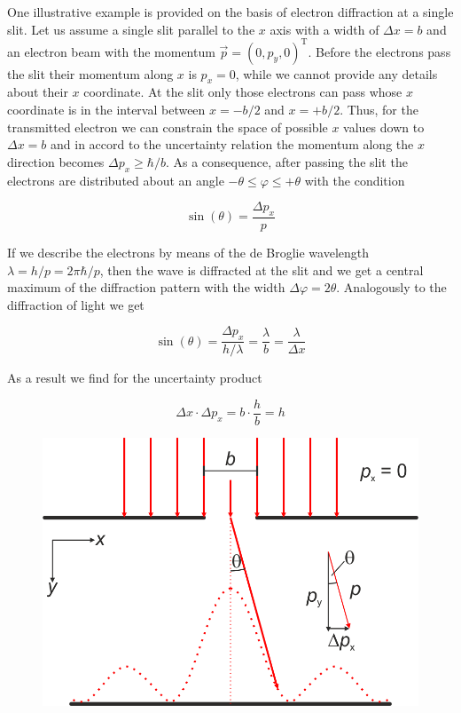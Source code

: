 \documentclass[
  a4paper,
]{book}
\begin{document}
\begin{tcolorbox}[enhanced jigsaw, coltitle=black, title=\textcolor{quarto-callout-note-color}{\faInfo}\hspace{0.5em}{Example: Electron diffraction at a single slit}, colframe=quarto-callout-note-color-frame, toprule=.15mm, opacitybacktitle=0.6, left=2mm, opacityback=0, breakable, toptitle=1mm, bottomtitle=1mm, leftrule=.75mm, arc=.35mm, titlerule=0mm, colbacktitle=quarto-callout-note-color!10!white, rightrule=.15mm, bottomrule=.15mm, colback=white]

One illustrative example is provided on the basis of electron
diffraction at a single slit. Let us assume a single slit parallel to
the \(x\) axis with a width of \(\Delta x = b\) and an electron beam
with the momentum \(\vec{p} = \left( 0,p_y,0 \right)^{\mathrm{T}}\).
Before the electrons pass the slit their momentum along \(x\) is
\(p_x = 0\), while we cannot provide any details about their \(x\)
coordinate. At the slit only those electrons can pass whose \(x\)
coordinate is in the interval between \(x = -b/2\) and \(x = +b/2\).
Thus, for the transmitted electron we can constrain the space of
possible \(x\) values down to \(\Delta x = b\) and in accord to the
uncertainty relation the momentum along the \(x\) direction becomes
\(\Delta p_x \ge \hbar / b\). As a consequence, after passing the slit
the electrons are distributed about an angle
\(-\theta \le \varphi \le + \theta\) with the condition

\[
\sin \left( \theta \right)= \frac{\Delta p_x}{p}
\]

If we describe the electrons by means of the de Broglie wavelength
\(\lambda = h/p = 2\pi\hbar/p\), then the wave is diffracted at the slit
and we get a central maximum of the diffraction pattern with the width
\(\Delta \varphi = 2 \theta\). Analogously to the diffraction of light
we get

\[
\sin \left( \theta \right)= \frac{\Delta p_x}{h/\lambda} = \frac{\lambda}{b}=\frac{\lambda}{\Delta x}
\]

As a result we find for the uncertainty product

\[
\Delta x \cdot \Delta p_x = b \cdot \frac{h}{b} = h
\]

\begin{figure}[H]

{\centering \includegraphics[width=0.45\linewidth,height=\textheight,keepaspectratio]{quantum-mechanics/img/L24_uncertainty_singleslit.png}

}
\end{figure}
\end{tcolorbox}
\end{document}
